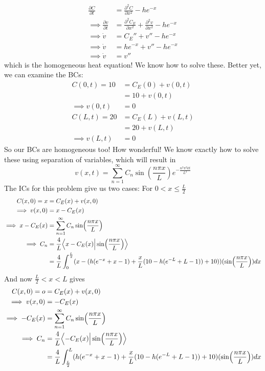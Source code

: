 \documentclass[12pt]{article}
\begin{document}
\begin{enumerate}
\begin{enumerate}
            \begin{align*}
                \frac{\partial C}{\partial t}&=\frac{\partial^2 C}{\partial x^2}-he^{-x}\\
                \implies \frac{\partial v}{\partial t}&=\frac{\partial^2 C_E}{\partial x^2}+\frac{\partial^2 v}{\partial x^2}-he^{-x}\\
                \implies \dot{v}&=C_E''+v''-he^{-x}\\
                \implies \dot{v}&=he^{-x}+v''-he^{-x}\\
                \implies \dot{v}&=v''
            \end{align*}
            which is the homogeneous heat equation! We know how to solve these. Better yet, we can examine 
            the BCs:
            \begin{align*}
                C(0,t)=10&=C_E(0)+v(0,t)\\
                &=10+v(0,t)\\
                \implies v(0,t)&=0\\
                C(L,t)=20&=C_E(L)+v(L,t)\\
                &=20+v(L,t)\\
                \implies v(L,t)&=0
            \end{align*}
            So our BCs are homogeneous too! How wonderful! We know exactly how to solve these using separation 
            of variables, which will result in 
            \begin{equation*}
                v(x,t)=\sum_{n=1}^\infty C_n\sin(\frac{n\pi x}{L})e^{-\frac{n^2\pi^2kt}{L^2}}
            \end{equation*}
            The ICs for this problem give us two cases:\newline
            For $0<x\leq\frac{L}{2}$
            \begin{align*}
                C(x,0)=x&=C_E(x)+v(x,0)\\
                \implies v(x,0)&=x-C_E(x)\\
                \implies x-C_E(x)&=\sum_{n=1}^\infty C_n\sin(\frac{n\pi x}{L})\\
                \implies C_n&=\frac{4}{L} \Bigl< x-C_E(x) \Big| \sin(\frac{n\pi x}{L}) \Bigr>\\
                &= \frac{4}{L}\int_0^{\frac{L}{2}} (x-(h(e^{-x}+x-1)+\frac{x}{L}(10-h(e^{-L}+L-1))+10))(\sin(\frac{n\pi x}{L}))dx
            \end{align*}
            And now $\frac{L}{2}<x<L$ gives
            \begin{align*}
                C(x,0)=o&=C_E(x)+v(x,0)\\
                \implies v(x,0)&=-C_E(x)\\
                \implies -C_E(x)&=\sum_{n=1}^\infty C_n\sin(\frac{n\pi x}{L})\\
                \implies C_n&=\frac{4}{L}\Bigl<-C_E(x) \Big| \sin(\frac{n\pi x}{L})\Bigr>\\
                &= \frac{4}{L} \int_{\frac{L}{2}}^L (h(e^{-x}+x-1)+\frac{x}{L}(10-h(e^{-L}+L-1))+10)(\sin(\frac{n\pi x}{L}))dx
            \end{align*}


\end{enumerate}
\end{enumerate}
\end{document}
